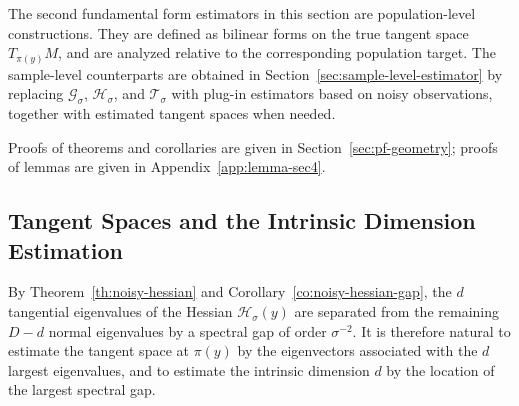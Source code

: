 \documentclass[11pt]{article}
\theoremstyle{plain}
\theoremstyle{definition}
\begin{document}
The second fundamental form estimators in this section are population-level constructions. They are defined as bilinear forms on the true tangent space $T_{\pi(y)}M$, and are analyzed relative to the corresponding population target. The sample-level counterparts are obtained in Section~\ref{sec:sample-level-estimator} by replacing $\mathcal G_\sigma$, $\mathcal H_\sigma$, and $\mathcal T_\sigma$ with plug-in estimators based on noisy observations, together with estimated tangent spaces when needed.

Proofs of theorems and corollaries are given in Section~\ref{sec:pf-geometry}; proofs of lemmas are given in Appendix~\ref{app:lemma-sec4}.

\subsection{Tangent Spaces and the Intrinsic Dimension Estimation}
By Theorem~\ref{th:noisy-hessian} and Corollary~\ref{co:noisy-hessian-gap}, the $d$ tangential eigenvalues of the Hessian $\mathcal H_\sigma(y)$ are separated from the remaining $D-d$ normal eigenvalues by a spectral gap of order $\sigma^{-2}$.
It is therefore natural to estimate the tangent space at $\pi(y)$ by the eigenvectors associated with the $d$ largest eigenvalues, and to estimate the intrinsic dimension $d$ by the location of the largest spectral gap.
\end{document}
